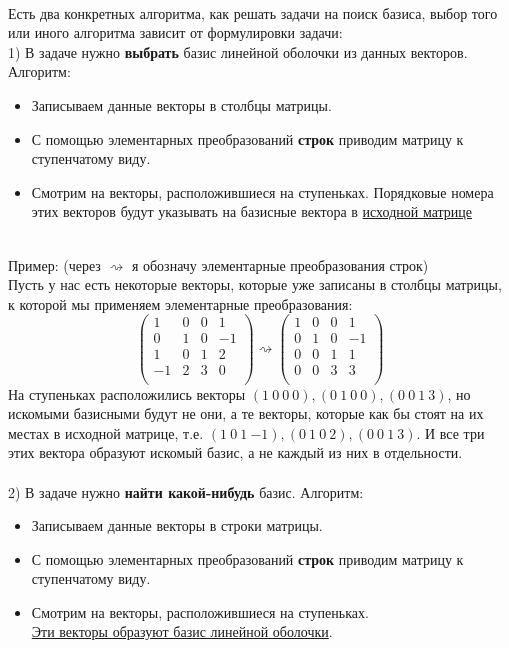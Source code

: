 \documentclass[a4paper,11pt]{report}
\begin{document}
\\
Есть два конкретных алгоритма, как решать задачи на поиск базиса, выбор того или иного алгоритма зависит от формулировки задачи:\\
1) В задаче нужно \textbf{выбрать} базис линейной оболочки из данных векторов. Алгоритм:\\
\begin{itemize}
     \item Записываем данные векторы в столбцы матрицы.
     \item С помощью элементарных преобразований \textbf{строк} приводим матрицу к ступенчатому виду.
     \item Смотрим на векторы, расположившиеся на ступеньках. Порядковые номера этих векторов будут указывать на
     базисные вектора в \underline{исходной матрице}
\end{itemize}\\
Пример: (через $\rightsquigarrow$ я обозначу элементарные преобразования строк)\\
Пусть у нас есть некоторые векторы, которые уже записаны в столбцы матрицы, к которой мы применяем элементарные преобразования:\\
\[
\begin{pmatrix}
1 & 0 & 0 & 1\\
0 & 1 & 0 & -1\\
1 & 0 & 1 & 2\\
-1 & 2 & 3 & 0\\
\end{pmatrix}
\rightsquigarrow
\begin{pmatrix}
1 & 0 & 0 & 1\\
0 & 1 & 0 & -1\\
0 & 0 & 1 & 1\\
0 & 0 & 3 & 3\\
\end{pmatrix}
\]
На ступеньках расположились векторы $(1\ 0\ 0\ 0), (0\ 1\ 0\ 0), (0\ 0\ 1\ 3)$, но искомыми базисными будут не они, а те векторы,
которые как бы стоят на их местах в исходной матрице, т.е. $(1\ 0\ 1\ {-1}), (0\ 1\ 0\ 2), (0\ 0\ 1\ 3)$. 
И все три этих вектора образуют искомый базис, а не каждый из них в отдельности.\\
\\
2) В задаче нужно \textbf{найти какой-нибудь} базис. Алгоритм:\\
\begin{itemize}
     \item Записываем данные векторы в строки матрицы.
     \item С помощью элементарных преобразований \textbf{строк} приводим матрицу к ступенчатому виду.
     \item Смотрим на векторы, расположившиеся на ступеньках.\\
     \underline{Эти векторы образуют базис линейной оболочки}.
\end{itemize}\\
\end{document}
